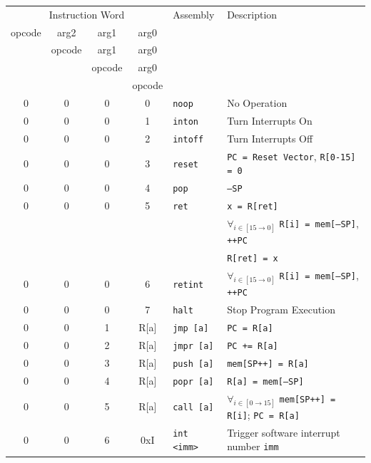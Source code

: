 \documentclass{article}
\begin{document}
\begin{table}[h!]
    \centering
    \begin{footnotesize}
        \begin{tabular}{cccc|l|l}
            \hline
            \multicolumn{4}{c|}{Instruction Word} & Assembly & Description \\
            opcode & arg2 & arg1 & arg0 & & \\
            {} & opcode & arg1 & arg0 & & \\
            {} & {} & opcode & arg0 & & \\
            {} & {} & {} & opcode & & \\
            \hline
            0 & 0 & 0 & 0 & \texttt{noop} & No Operation \\
            0 & 0 & 0 & 1 & \texttt{inton} & Turn Interrupts On \\
            0 & 0 & 0 & 2 & \texttt{intoff} & Turn Interrupts Off \\
            0 & 0 & 0 & 3 & \texttt{reset} & \texttt{PC = Reset Vector}, \texttt{R[0-15] = 0} \\
            0 & 0 & 0 & 4 & \texttt{pop} & \texttt{--SP} \\
            0 & 0 & 0 & 5 & \texttt{ret} & \texttt{x = R[ret]} \\
            {} & {} & {} & {} & {} & $\forall_{i \in [15 \rightarrow 0]}$ \texttt{R[i] = mem[--SP]}, \texttt{++PC} \\
            {} & {} & {} & {} & {} & \texttt{R[ret] = x} \\
            0 & 0 & 0 & 6 & \texttt{retint} & $\forall_{i \in [15 \rightarrow 0]}$ \texttt{R[i] = mem[--SP]}, \texttt{++PC} \\
            0 & 0 & 0 & 7 & \texttt{halt} & Stop Program Execution \\
            0 & 0 & 1 & R[a] & \texttt{jmp [a]} & \texttt{PC = R[a]} \\
            0 & 0 & 2 & R[a] & \texttt{jmpr [a]} & \texttt{PC += R[a]} \\
            0 & 0 & 3 & R[a] & \texttt{push [a]} & \texttt{mem[SP++] = R[a]} \\
            0 & 0 & 4 & R[a] & \texttt{popr [a]} & \texttt{R[a] = mem[--SP]} \\
            0 & 0 & 5 & R[a] & \texttt{call [a]} & $\forall_{i \in [0 \rightarrow 15]}$
            \texttt{mem[SP++] = R[i]}; \texttt{PC = R[a]} \\
            0 & 0 & 6 & 0xI & \texttt{int <imm>} & Trigger software interrupt number \texttt{imm} \\

\end{tabular}
\end{footnotesize}
\end{table}
\end{document}

